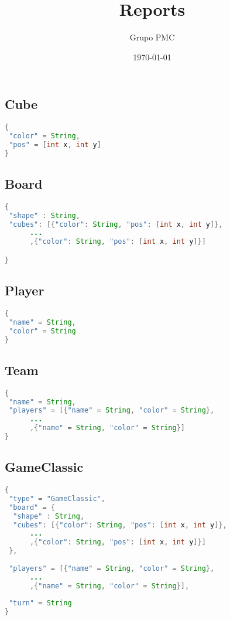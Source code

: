 \documentclass{article}
\title{Reports}
\date{\today}
\author{Grupo PMC}
\begin{document}
\maketitle

\subsection*{Cube}

\begin{lstlisting}[frame=single, language=Java]
{
 "color" = String,
 "pos" = [int x, int y]
}
\end{lstlisting}

\subsection*{Board}
\begin{lstlisting}[frame=single, language=Java]
{
 "shape" : String,
 "cubes": [{"color": String, "pos": [int x, int y]},
 	  ...
 	  ,{"color": String, "pos": [int x, int y]}]

}
\end{lstlisting}

\subsection*{Player}

\begin{lstlisting}[frame=single, language=Java]
{
 "name" = String,
 "color" = String
}
\end{lstlisting}

\subsection*{Team}

\begin{lstlisting}[frame=single, language=Java]
{
 "name" = String,
 "players" = [{"name" = String, "color" = String},
 	  ...
 	  ,{"name" = String, "color" = String}]
}
\end{lstlisting}

\newpage

\subsection*{GameClassic}
\begin{lstlisting}[frame=single, language=Java]
{
 "type" = "GameClassic",
 "board" = {
  "shape" : String,
  "cubes": [{"color": String, "pos": [int x, int y]},
  	  ...
  	  ,{"color": String, "pos": [int x, int y]}]
 },
 
 "players" = [{"name" = String, "color" = String},
 	  ...
 	  ,{"name" = String, "color" = String}],
 
 "turn" = String	
}
\end{lstlisting}
\end{document}

